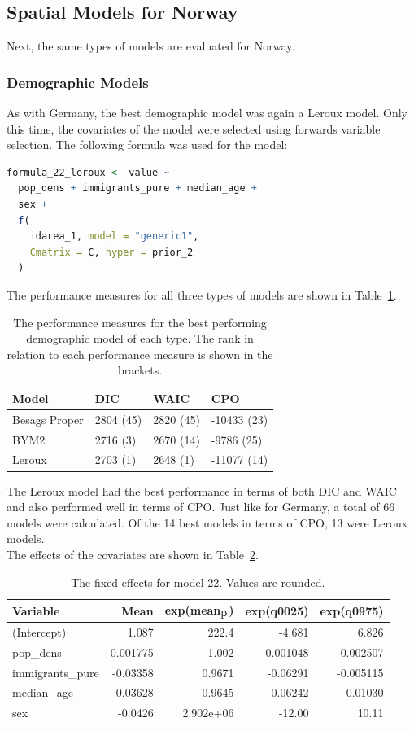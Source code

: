 \subsection{Spatial Models for Norway}
Next, the same types of models are evaluated for Norway.
\subsubsection{Demographic Models}
As with Germany, the best demographic model was again a Leroux model. Only this time, the covariates of the model were selected using forwards variable selection. The following formula was used for the model:
\begin{lstlisting}[language = R]
formula_22_leroux <- value ~
  pop_dens + immigrants_pure + median_age +
  sex +
  f(
    idarea_1, model = "generic1",
    Cmatrix = C, hyper = prior_2
  )
\end{lstlisting}
The performance measures for all three types of models are shown in Table~\ref{demoNorway}.
\begin{table}[H] 
\caption{The performance measures for the best performing demographic model of each type. The rank in relation to each performance measure is shown in the brackets. \label{demoNorway}}
\begin{tabular}{l l l l}
\toprule
\textbf{Model}	& \textbf{DIC}	& \textbf{WAIC} & \textbf{CPO} \\
\midrule
Besags Proper  & 2804 (45) & 2820 (45) & -10433 (23) \\
BYM2 & 2716 (3) & 2670 (14) & -9786 (25)\\
Leroux & 2703 (1) & 2648 (1) & -11077 (14) \\
\bottomrule
\end{tabular}
\end{table}
The Leroux model had the best performance in terms of both DIC and WAIC and also performed well in terms of CPO. Just like for Germany, a total of 66 models were calculated. Of the 14 best models in terms of CPO, 13 were Leroux models. \\
The effects of the covariates are shown in Table~\ref{fixedDemoNorway}.
\begin{table}[H] 
\caption{The fixed effects for model 22. Values are rounded. \label{fixedDemoNorway}}
\begin{tabular}{l r r r r}
\toprule
\textbf{Variable}	& \textbf{Mean}	& \textbf{exp(mean$_{\hbox{p}}$)} & \textbf{exp(q0025)} & \textbf{exp(q0975)} \\
\midrule
(Intercept) & 1.087 & 222.4 & -4.681 & 6.826\\
pop\_dens & 0.001775 & 1.002 & 0.001048 & 0.002507\\
immigrants\_pure & -0.03358 & 0.9671 & -0.06291 & -0.005115\\
median\_age & -0.03628  & 0.9645 & -0.06242 & -0.01030\\
sex & -0.0426 & 2.902e+06 & -12.00 & 10.11 \\
\bottomrule
\end{tabular}
\end{table}
